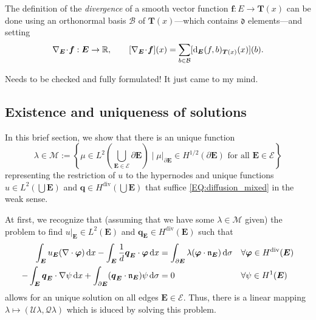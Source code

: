 \documentclass[a4paper, english, 12pt, reqno, draft]{amsart}
\theoremstyle{definition}
\theoremstyle{remark}
\numberwithin{equation}{section}
\newcommand{\SetEdge}{\ensuremath{\boldsymbol{\mathcal E}}}
\newcommand{\Edge}{{\ensuremath{\boldsymbol E}}}
\newcommand{\locDim}{\ensuremath{\mathfrak d}}
\newcommand{\Der}{\ensuremath{\textup d_\Edge}}
\newcommand{\Nabla}{\ensuremath{\nabla_\Edge}}
\newcommand{\Div}{\ensuremath{\Nabla\!\cdot\!}}
\newcommand{\tangent}{\ensuremath{{\boldsymbol T}}}
\newcommand{\Normal}{\ensuremath{\mathfrak n_\Edge}}
\newcommand{\basis}{\ensuremath{\mathcal B}}
\newcommand{\IR}{\ensuremath{\mathbb R}}
\newcommand{\skeletalSpaceCont}{\ensuremath{\mathcal M}}
\renewcommand{\vec}[1]{\ensuremath{\boldsymbol{#1}}}
\newcommand{\dx}{\ensuremath{\, \textup d x}}
\newcommand{\ds}{\ensuremath{\, \textup d \sigma}}
\newcommand{\localU}{\ensuremath{\mathcal U}}
\newcommand{\localQ}{\ensuremath{\vec{\mathcal Q}}}
\begin{document}
The definition of the \emph{divergence} of a smooth vector function $\vec f \colon E \to \tangent(x)$ can be done using an orthonormal basis $\basis$ of $\tangent(x)$---which contains $\locDim$ elements---and setting
% 
\begin{equation*}
 \Div \vec f: \Edge \to \IR, \qquad [\Div \vec f](x) = \sum_{b \in \basis} [\Der (f, b)_{\tangent(x)} (x)](b).
\end{equation*}
% 
\begin{envarerror}{Needs to be checked and fully formulated! It just came to my mind.}
% 
\subsection{Existence and uniqueness of solutions}\label{SEC:ExUnique}
% 
In this brief section, we show that there is an unique function
% 
\begin{equation}
 \lambda \in \skeletalSpaceCont := \left\{ \mu \in L^2(\bigcup_{\Edge \in \SetEdge} \partial \Edge) \; \bigg| \; \mu |_{\partial \Edge} \in H^{1/2} (\partial \Edge) \text{ for all } \Edge \in \SetEdge \right\}
\end{equation}
% 
representing the restriction of $u$ to the hypernodes and unique functions $u \in L^2(\bigcup \Edge)$ and $\vec q \in H^{\operatorname{div}}(\bigcup \Edge)$ that suffice \eqref{EQ:diffusion_mixed} in the weak sense.

At first, we recognize that (assuming that we have some $\lambda \in \skeletalSpaceCont$ given) the problem to find $u|_\Edge \in L^2(\Edge)$ and $\vec q_\Edge \in H^{\operatorname{div}}(\Edge)$ such that
% 
\begin{subequations}\label{EQ:cont_lambda}
\begin{align}
 \int_\Edge u_\Edge (\nabla \cdot \vec \varphi) \dx - \int_\Edge \frac{1}{d} \vec q_\Edge \cdot \vec \varphi \dx & = \int_{\partial \Edge} \lambda (\vec \varphi \cdot \Normal) \ds && \forall \vec \varphi \in H^{\operatorname{div}}(\Edge) \\
 - \int_\Edge \vec q_\Edge \cdot \nabla \psi \dx + \int_{\partial \Edge} (\vec q_\Edge \cdot \Normal) \psi \ds & = 0 && \forall \psi \in H^1(\Edge)
\end{align}
\end{subequations}
% 
allows for an unique solution on all edges $\Edge \in \SetEdge$. Thus, there is a linear mapping $\lambda \mapsto (\localU \lambda, \localQ\lambda)$ which is iduced by solving this problem.


\end{envarerror}
\end{document}
